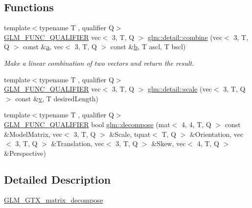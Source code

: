 \subsection*{Functions}
\begin{DoxyCompactItemize}
\item 
{\footnotesize template$<$typename T , qualifier Q$>$ }\\\mbox{\hyperlink{setup_8hpp_a33fdea6f91c5f834105f7415e2a64407}{G\+L\+M\+\_\+\+F\+U\+N\+C\+\_\+\+Q\+U\+A\+L\+I\+F\+I\+ER}} vec$<$ 3, T, Q $>$ \mbox{\hyperlink{namespaceglm_1_1detail_a62c6df7a0862562560f4ff00b215f4e6}{glm\+::detail\+::combine}} (vec$<$ 3, T, Q $>$ const \&\mbox{\hyperlink{_s_d_l__opengl__glext_8h_a3309789fc188587d666cda5ece79cf82}{a}}, vec$<$ 3, T, Q $>$ const \&\mbox{\hyperlink{_s_d_l__opengl__glext_8h_a0f71581a41fd2264c8944126dabbd010}{b}}, T ascl, T bscl)
\begin{DoxyCompactList}\small\item\em Make a linear combination of two vectors and return the result. \end{DoxyCompactList}\item 
{\footnotesize template$<$typename T , qualifier Q$>$ }\\\mbox{\hyperlink{setup_8hpp_a33fdea6f91c5f834105f7415e2a64407}{G\+L\+M\+\_\+\+F\+U\+N\+C\+\_\+\+Q\+U\+A\+L\+I\+F\+I\+ER}} vec$<$ 3, T, Q $>$ \mbox{\hyperlink{namespaceglm_1_1detail_ab5e74c51452215027ae64d0ef1731f9c}{glm\+::detail\+::scale}} (vec$<$ 3, T, Q $>$ const \&\mbox{\hyperlink{_s_d_l__opengl_8h_a10a82eabcb59d2fcd74acee063775f90}{v}}, T desired\+Length)
\item 
{\footnotesize template$<$typename T , qualifier Q$>$ }\\\mbox{\hyperlink{setup_8hpp_a33fdea6f91c5f834105f7415e2a64407}{G\+L\+M\+\_\+\+F\+U\+N\+C\+\_\+\+Q\+U\+A\+L\+I\+F\+I\+ER}} bool \mbox{\hyperlink{group__gtx__matrix__decompose_ga91185463739c855d602596907a9994bc}{glm\+::decompose}} (mat$<$ 4, 4, T, Q $>$ const \&Model\+Matrix, vec$<$ 3, T, Q $>$ \&Scale, tquat$<$ T, Q $>$ \&Orientation, vec$<$ 3, T, Q $>$ \&Translation, vec$<$ 3, T, Q $>$ \&Skew, vec$<$ 4, T, Q $>$ \&Perspective)
\end{DoxyCompactItemize}


\subsection{Detailed Description}
\mbox{\hyperlink{group__gtx__matrix__decompose}{G\+L\+M\+\_\+\+G\+T\+X\+\_\+matrix\+\_\+decompose}} 